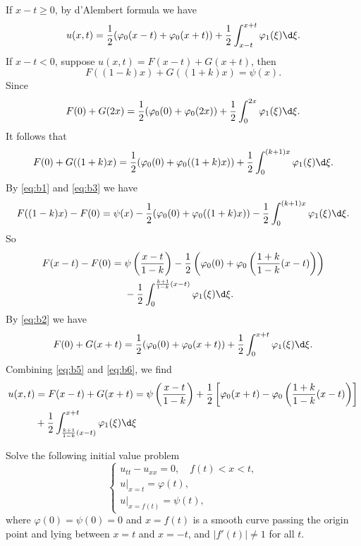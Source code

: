 \begin{solve}
  If $x-t\geq 0$, by d'Alembert formula we have
  \[u(x,t) = \frac{1}{2}(\varphi_0(x-t)+\varphi_0(x+t))
    + \frac{1}{2}\int_{x-t}^{x+t}\varphi_1(\xi)\d\xi.\]
  If $x-t<0$, suppose $u(x,t) = F(x-t) + G(x+t)$, then
  \begin{equation}\label{eq:b1}
    F((1-k)x)+G((1+k)x)=\psi(x).
  \end{equation}
  Since
  \begin{equation}\label{eq:b2}
    F(0)+G(2x)=\frac{1}{2}(\varphi_0(0)+\varphi_0(2x))+\frac{1}{2}\int_0^{2x}\varphi_1(\xi)\d\xi.
  \end{equation}
  It follows that
  \begin{equation}\label{eq:b3}
    F(0)+G((1+k)x) = \frac{1}{2}(\varphi_0(0)+\varphi_0((1+k)x))
      + \frac{1}{2}\int_0^{(k+1)x}\varphi_1(\xi) \d\xi.
  \end{equation}
  By \eqref{eq:b1} and \eqref{eq:b3} we have
  \begin{equation}\label{eq:b4}
    F((1-k)x)-F(0) = \psi(x)-\frac{1}{2}(\varphi_0(0)+\varphi_0((1+k)x))
      - \frac{1}{2}\int_0^{(k+1)x}\varphi_1(\xi) \d\xi.
  \end{equation}
  So
  \begin{equation}\label{eq:b5}
    \begin{aligned}
      F(x-t)-F(0) ={}
      & \psi\left(\frac{x-t}{1-k}\right)-\frac{1}{2}\left(\varphi_0(0)+\varphi_0\left(\frac{1+k}{1-k}(x-t)\right)\right) \\
      & -\frac{1}{2}\int_0^{\frac{k+1}{1-k}(x-t)}\varphi_1(\xi) \d\xi.
    \end{aligned}
  \end{equation}
  By \eqref{eq:b2} we have
  \begin{equation}\label{eq:b6}
    F(0)+G(x+t)=\frac{1}{2}(\varphi_0(0)+\varphi_0(x+t))+\frac{1}{2}\int_0^{x+t}\varphi_1(\xi) \d\xi.
  \end{equation}
  Combining \eqref{eq:b5} and \eqref{eq:b6}, we find
  \[\begin{split}
    u(x,t)
    & = F(x-t)+G(x+t)=\psi\left(\frac{x-t}{1-k}\right)+\frac{1}{2}\left[\varphi_0(x+t)-\varphi_0\left(\frac{1+k}{1-k}(x-t)\right)\right] \\
    & + \frac{1}{2}\int_{\frac{k+1}{1-k}(x-t)}^{x+t}\varphi_1(\xi) \d\xi
  \end{split}\]
\end{solve}


\begin{exercise}
  Solve the following initial value problem
  \[\begin{cases}
    u_{tt} - u_{xx} = 0,\quad f(t) < x < t, \\
    u|_{x=t} = \varphi(t), \\
    u|_{x = f(t)} = \psi(t),
  \end{cases}\]
  where $\varphi(0)=\psi(0)=0$ and $x = f(t)$ is a smooth curve
  passing the origin point and lying between $x=t$ and $x=-t$,
  and $|f'(t)|\neq 1$ for all $t$.
\end{exercise}

